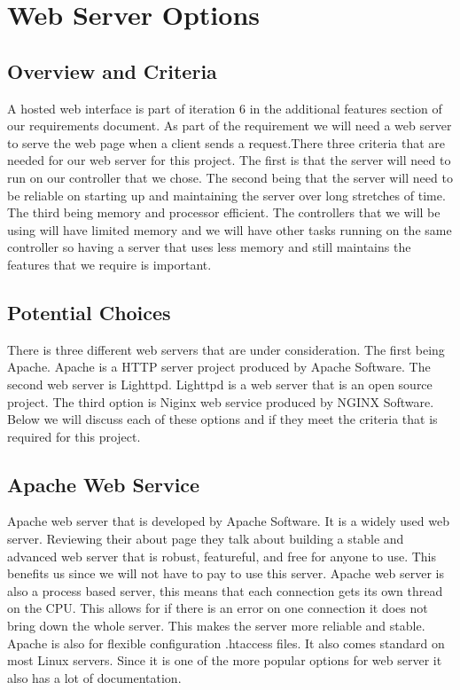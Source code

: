 \documentclass[onecolumn, draftclsnofoot,10pt, compsoc]{IEEEtran}
\begin{document}
	\section{Web Server Options}
		\subsection{Overview and Criteria}
		A hosted web interface is part of iteration 6 in the additional features
		section of our requirements document. As part of the requirement we will
		need a web server to serve the web page when a client sends a request.There three
		criteria that are needed for our web server for this project. The first is that
		the server will need to run on our controller that we chose. The second being
		that the server will need to be reliable on starting up and maintaining the
		server over long stretches of time. The third being memory and processor efficient.
		The controllers that we will be using will have limited memory and we will have
		other tasks running on the same controller so having a server that uses less
		memory and still maintains the features that we require is important.
		\subsection{Potential Choices }
		There is three different web servers that are under consideration. The first
		being Apache. Apache is a HTTP server project produced by Apache Software. The
		second web server is Lighttpd. Lighttpd is a web server that is an open source
		project. The third option is Niginx web service produced by NGINX Software.
		Below we will discuss each of these options and if they meet the criteria
		that is required for this project.
		\subsection{Apache Web Service}
		Apache web server that is developed by Apache Software. It is a widely used
		web server. Reviewing their about page \cite[pg 2]{Apache} they talk about
		building a stable and advanced web server that is robust, featureful, and
		free for anyone to use. This benefits us since we will not have to pay to use
		this server. Apache web server is also a process based server, this means
		that each connection gets its own thread on the CPU. This allows for if there
		is an error on one connection it does not bring down the whole server. This
		makes the server more reliable and stable. Apache is also for flexible configuration
		.htaccess files. It also comes standard on most Linux servers. Since it is
		one of the more popular options for web server it also has a lot of documentation.
\end{document}
